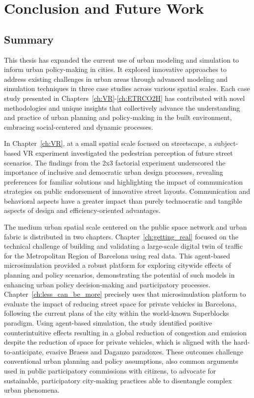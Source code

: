 \chapter{Conclusion and Future Work}
\label{ch:Conclusion}

\graphicspath{{chapters/05_conclusion_outlook/figures/}}

\section{Summary}
This thesis has expanded the current use of urban modeling and simulation to inform urban policy-making in cities. It explored innovative approaches to address existing challenges in urban areas through advanced modeling and simulation techniques in three case studies across various spatial scales. Each case study presented in Chapters~\ref{ch:VR}-\ref{ch:ETRCO2H} has contributed with novel methodologies and unique insights that collectively advance the understanding and practice of urban planning and policy-making in the built environment, embracing social-centered and dynamic processes.

In Chapter~\ref{ch:VR}, at a small spatial scale focused on streetscape, a subject-based VR experiment investigated the pedestrian perception of future street scenarios. The findings from the 2x3 factorial experiment underscored the importance of inclusive and democratic urban design processes, revealing preferences for familiar solutions and highlighting the impact of communication strategies on public endorsement of innovative street layouts. Communication and behavioral aspects have a greater impact than purely technocratic and tangible aspects of design and efficiency-oriented advantages.

The medium urban spatial scale centered on the public space network and urban fabric is distributed in two chapters. Chapter~\ref{ch:getting_real} focused on the technical challenge of building and validating a large-scale digital twin of traffic for the Metropolitan Region of Barcelona using real data. This agent-based microsimulation provided a robust platform for exploring citywide effects of planning and policy scenarios, demonstrating the potential of such models in enhancing urban policy decision-making and participatory processes. Chapter~\ref{ch:less_can_be_more} precisely uses that microsimulation platform to evaluate the impact of reducing street space for private vehicles in Barcelona, following the current plans of the city within the world-known Superblocks paradigm. Using agent-based simulation, the study identified positive counterintuitive effects resulting in a global reduction of congestion and emission despite the reduction of space for private vehicles, which is aligned with the hard-to-anticipate, evasive Braess and Daganzo paradoxes.  These outcomes challenge conventional urban planning and policy assumptions, also common arguments used in public participatory commissions with citizens, to advocate for sustainable, participatory city-making practices able to disentangle complex urban phenomena.


